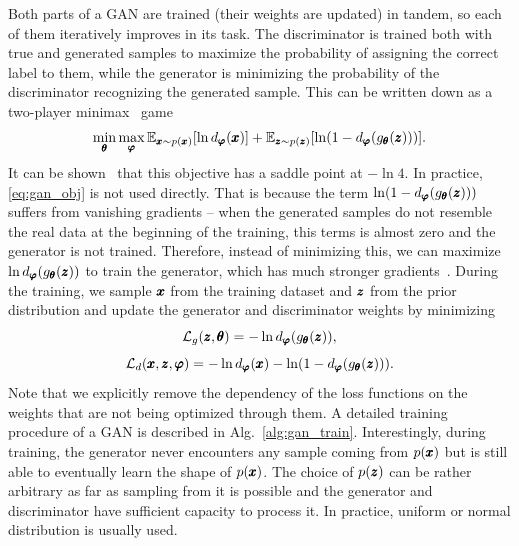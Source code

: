 Both parts of a GAN are trained (their weights are updated) in tandem, so each of them iteratively improves in its task. The discriminator is trained both with true and generated samples to maximize the probability of assigning the correct label to them, while the generator is minimizing the probability of the discriminator recognizing the generated sample. This can be written down as a two-player minimax~\cite{maschler2020game} game 
\begin{equation} \label{eq:gan_obj}
\min_{\vc{\theta}}\max_{\vc{\varphi}}\mathbb{E}_{ \vc{x} \sim p(\vc{x})}\left[\ln d_{\vc{\varphi}}(\vc{x})\right]+\mathbb{E}_{\vc{z}\sim p(\vc{z})}\left[\ln\left(1-d_{\vc{\varphi}}(g_{\vc{\theta}}(\vc{z}))\right)\right].
\end{equation}
It can be shown~\cite{goodfellow2014gan} that this objective has a saddle point at $-\ln4$. In practice, \eqref{eq:gan_obj} is not used directly. That is because the term $\ln\left(1-d_{\vc{\varphi}}(g_{\vc{\theta}}(\vc{z}))\right)$ suffers from vanishing gradients -- when the generated samples do not resemble the real data at the beginning of the training, this terms is almost zero and the generator is not trained. Therefore, instead of minimizing this, we can maximize $\ln d_{\pmb{{\varphi}}}(g_{\pmb{{\theta}}}(\pmb{{z}}))$ to train the generator, which has much stronger gradients~\cite{goodfellow2014gan}. During the training, we sample $\pmb{{x}}$ from the training dataset and $\pmb{{z}}$ from the prior distribution and update the generator and discriminator weights by minimizing
\begin{equation}\label{eq:gen_loss}
\mathcal{L}_{g}(\pmb{{z}},\pmb{{\theta}})= - \ln d_{\pmb{{\varphi}}}(g_{\pmb{{\theta}}}(\pmb{{z}})),
\end{equation}
\begin{equation}\label{eq:disc_loss}
\mathcal{L}_{d}(\vc{x},\vc{z},\vc{\varphi})= - \ln d_{\vc{\varphi}}(\vc{x}) - \ln\left(1-d_{\vc{\varphi}}(g_{\vc{\theta}}(\vc{z}))\right).
\end{equation}
Note that we explicitly remove the dependency of the loss functions on the weights that are not being optimized through them. A detailed training procedure of a GAN is described in Alg.~\ref{alg:gan_train}. Interestingly, during training, the generator never encounters any sample coming from $p(\pmb{{x}})$ but is still able to eventually learn the shape of $p(\pmb{{x}})$. The choice of $p(\pmb{{z}})$ can be rather arbitrary as far as sampling from it is possible and the generator and discriminator have sufficient capacity to process it. In practice, uniform or normal distribution is usually used. 

